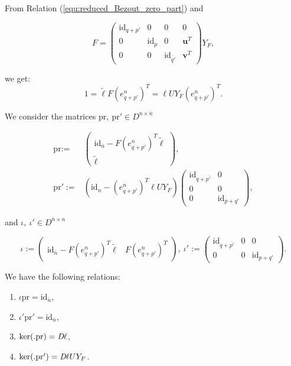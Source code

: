 \documentclass{ifacconf}
\newcommand\g[1]{\textbf{#1}}
\newcommand\id[1]{\text{id}_{#1}}
\newcommand\p{\text{pr}}
\begin{document}
From Relation (\ref{equ:reduced_Bezout_zero_part}) and
\medskip
\begin{small}
  \[F=\begin{pmatrix}
  \id{q+p'} & 0 & 0 & 0\\
  0 & \id{p} & 0 & \g{u}^T\\
  0 & 0 & \id{\overline{q'}} & \g{v}^T
  \end{pmatrix}Y_F,
  \]
\end{small}
\medskip
we get:
\medskip
\begin{equation}\label{equ:extend_Bezout_zero_part}
  1=\tilde{\ell}F(e^n_{q+p'})^T=\ell UY_F(e^n_{q+p'})^T.
\end{equation}

We consider the matrices $\p,\ \p'\in D^{n\times\overline{n}}$
\begin{small}
  \[\begin{split}
  \p:=&\begin{pmatrix}
  \id{\overline{n}}-F(e^{n}_{q+p'})^T\tilde{\ell}\\
  \tilde{\ell}
  \end{pmatrix},\\
  \p':=&\left(\id{n}-(e^{n}_{q+p'})^T\ell UY_F\right)\begin{pmatrix}
  \id{q+\overline{p'}} & 0\\
  0 & 0\\
  0 & \id{p+q'}
  \end{pmatrix},
  \end{split}\]
  \end{small}
\medskip
and $\iota,\ \iota'\in D^{\overline{n}\times n}$ 
\begin{small}
  \[
  \iota:=\begin{pmatrix}
  \id{\overline{n}}-F(e^{n}_{q+p'})^T\tilde{\ell} &
  F(e^{n}_{q+p'})^T
  \end{pmatrix},\
  \iota':=\begin{pmatrix}
  \id{q+\overline{p'}} & 0 & 0\\
  0 & 0 & \id{p+q'}
  \end{pmatrix}.\]
\end{small}
\medskip

\begin{prop}\label{prop:exact_sequences_zero_part}
  We have the following relations:
  \vspace{-0.5cm}
  \begin{multicols}{2}
    \begin{enumerate}
    \item\label{it:split_pi_zero_part} $\iota\p=\id{\overline{n}}$,
    \item\label{it:split_pip_zero_part} $\iota'\p'=\id{\overline{n}}$,
    \item\label{it:ker_pi_zero_part} $\ker(.\p)=\emph{D}\ell$,
    \item\label{it:ker_pip_zero_part} $\ker(.\p')=\emph{D}\ell UY_F$.
    \end{enumerate}
  \end{multicols}
\end{prop}
\end{document}
